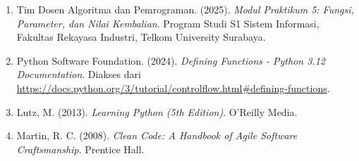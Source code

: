 \documentclass[12pt,a4paper]{article}
\begin{document}
\begin{enumerate}
    \item Tim Dosen Algoritma dan Pemrograman. (2025). \textit{Modul Praktikum 5: Fungsi, Parameter, dan Nilai Kembalian}. Program Studi S1 Sistem Informasi, Fakultas Rekayasa Industri, Telkom University Surabaya.

    \item Python Software Foundation. (2024). \textit{Defining Functions - Python 3.12 Documentation}. Diakses dari \url{https://docs.python.org/3/tutorial/controlflow.html#defining-functions}.

    \item Lutz, M. (2013). \textit{Learning Python (5th Edition)}. O'Reilly Media.

    \item Martin, R. C. (2008). \textit{Clean Code: A Handbook of Agile Software Craftsmanship}. Prentice Hall.
\end{enumerate}
\end{document}
